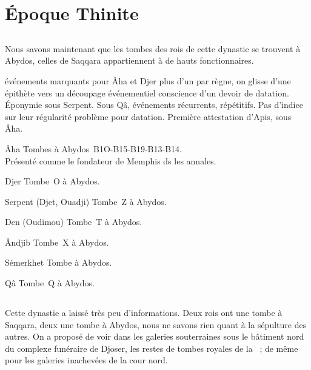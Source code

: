\section{Époque Thinite}


\subsection{\texorpdfstring{}{Ie dynastie}}

Nous savons maintenant que les tombes des rois de cette dynastie 
se trouvent à Abydos, celles de Saqqara appartiennent à de hauts 
fonctionnaires.

événements marquants pour Âha et Djer \donc{} plus d'un par règne, 
on glisse d'une épithète vers un découpage événementiel \donc{} 
conscience d'un devoir de datation.
Éponymie sous Serpent.
Sous Qâ, événements récurrents, répétitifs.
Pas d'indice sur leur régularité \donc{} problème pour datation.
Première attestation d'Apis, sous Âha.

\begin{listerois}
  \item [Âha] Tombes à Abydos~B1O-B15-B19-B13-B14.\\
        Présenté comme le fondateur de Memphis ds les annales.
  \item [Djer] Tombe~O à Abydos.
  \item [Serpent (Djet, Ouadji)] Tombe~Z à Abydos.
  \item [Den (Oudimou)] Tombe~T à Abydos.
  \item [Ândjib] Tombe~X à Abydos.
  \item [Sémerkhet] Tombe à Abydos.
  \item [Qâ] Tombe~Q à Abydos.
\end{listerois}

\subsection{\texorpdfstring{}{IIe dynastie}}

Cette dynastie a laissé très peu d'informations. Deux rois ont une 
tombe à Saqqara, deux une tombe à Abydos, nous ne savons rien quant à 
la sépulture des autres. On a proposé de voir dans les galeries 
souterraines sous le bâtiment nord du complexe funéraire de Djoser, 
les restes de tombes royales de la~ ; de même pour les 
galeries inachevées de la cour nord.

